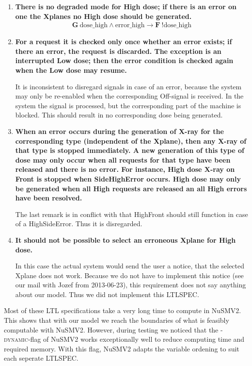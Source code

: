 \documentclass[a4paper,10pt]{article}
\newcommand{\LTLG}{\mathbf{G~}}
\newcommand{\LTLF}{\mathbf{F~}}
\newcommand{\imply}{\rightarrow}
\newcommand{\dosehigh}{\textrm{dose\_high}}
\newcommand{\errorhigh}{\textrm{error\_high}}
\begin{document}
\begin{enumerate}
		\item \textbf{There is no degraded mode for High dose; if there is an error on one the Xplanes no High dose should be generated.}
			\begin{align*}
				\LTLG \dosehigh \land \errorhigh \imply \LTLF !\dosehigh
			\end{align*}

		\item \textbf{For a request it is checked only once whether an error exists; if there an error, the request is discarded.
			The exception is an interrupted Low dose; then the error condition is checked again when the Low dose may resume.}
			
			It is inconsistent to disregard signals in case of an error, because the system may only be re-enabled when the corresponding Off-signal is received.
			In the system the signal is processed, but the corresponding part of the machine is blocked.
			This should result in no corresponding dose being generated.

		\item \textbf{When an error occurs during the generation of X-ray for the corresponding type (independent of the Xplane), then any X-ray of that type is stopped immediately.
			A new generation of this type of dose may only occur when all requests for that type have been released and there is no error.
			For instance, High dose X-ray on Front is stopped when SideHighError occurs.
			High dose may only be generated when all High requests are released an all High errors have been resolved.}
			
			The last remark is in conflict with that HighFront should still function in case of a HighSideError.
			Thus it is disregarded.

		\item \textbf{It should not be possible to select an erroneous Xplane for High dose.}
			
			In this case the actual system would send the user a notice, that the selected Xplane does not work.
			Because we do not have to implement this notice (see our mail with Jozef from 2013-06-23), this requirement does not say anything about our model.
			Thus we did not implement this LTLSPEC.
	\end{enumerate}
	
	Most of these LTL specifications take a very long time to compute in NuSMV2.
	This shows that with our model we reach the boundaries of what is feasibly computable with NuSMV2.
	However, during testing we noticed that the \textsc{-dynamic}-flag of NuSMV2 works exceptionally well to reduce computing time and required memory.
	With this flag, NuSMV2 adapts the variable ordening to suit each seperate LTLSPEC.
	
\end{document}
